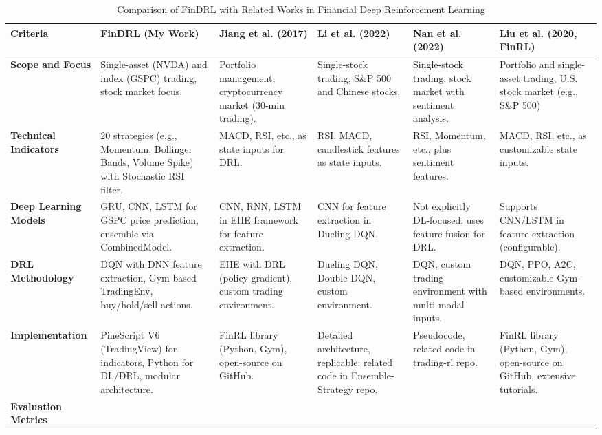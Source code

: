 \begin{table}[h]
\caption{Comparison of FinDRL with Related Works in Financial Deep Reinforcement Learning}
\label{tab:findrl_comparison}
\tiny
\begin{tabular}{| p{2.2cm}|p{2.2cm}|p{2.2cm}|p{2.2cm}|p{2.2cm}|p{2.2cm} |}
\toprule
\textbf{Criteria} & \textbf{FinDRL (My Work)} & \textbf{Jiang et al. (2017) \cite{jiang_deep_2017}} & \textbf{Li et al. (2022) \cite{li_stock_2022}} & \textbf{Nan et al. (2022)\cite{nan_deep_2022}} & \textbf{Liu et al. (2020, FinRL)\cite{liu_finrl_2020}} \\
\midrule
\textbf{Scope and Focus} & 
Single-asset (NVDA) and index (GSPC) trading, stock market focus. & 
Portfolio management, cryptocurrency market (30-min trading). & 
Single-stock trading, S\&P 500 and Chinese stocks. & 
Single-stock trading, stock market with sentiment analysis. & 
Portfolio and single-asset trading, U.S. stock market (e.g., S\&P 500)\\
\midrule
\textbf{Technical Indicators} & 
20 strategies (e.g., Momentum, Bollinger Bands, Volume Spike) with Stochastic RSI filter. & 
MACD, RSI, etc., as state inputs for DRL. & 
RSI, MACD, candlestick features as state inputs. & 
RSI, Momentum, etc., plus sentiment features. & 
MACD, RSI, etc., as customizable state inputs.\\
\midrule
\textbf{Deep Learning Models} & 
GRU, CNN, LSTM for GSPC price prediction, ensemble via CombinedModel. & 
CNN, RNN, LSTM in EIIE framework for feature extraction. & 
CNN for feature extraction in Dueling DQN. & 
Not explicitly DL-focused; uses feature fusion for DRL. & 
Supports CNN/LSTM in feature extraction (configurable).\\
\midrule
\textbf{DRL Methodology} & 
DQN with DNN feature extraction, Gym-based TradingEnv, buy/hold/sell actions. & 
EIIE with DRL (policy gradient), custom trading environment. & 
Dueling DQN, Double DQN, custom environment. & 
DQN, custom trading environment with multi-modal inputs. & 
DQN, PPO, A2C, customizable Gym-based environments.\\
\midrule
\textbf{Implementation} & 
PineScript V6 (TradingView) for indicators, Python for DL/DRL, modular architecture. & 
FinRL library (Python, Gym), open-source on GitHub. & 
Detailed architecture, replicable; related code in Ensemble-Strategy repo. & 
Pseudocode, related code in trading-rl repo. & 
FinRL library (Python, Gym), open-source on GitHub, extensive tutorials. \\
\midrule
\textbf{Evaluation Metrics} & 

\end{tabular}
\end{table}
